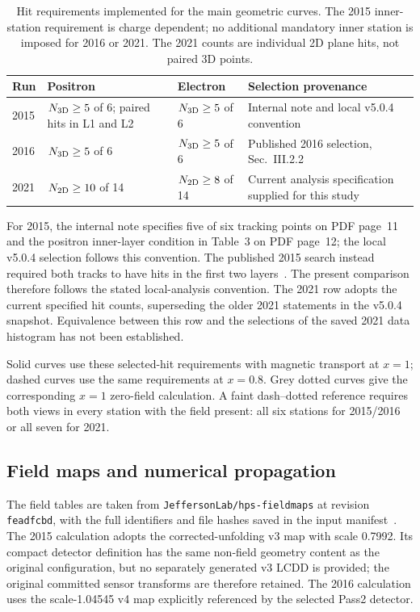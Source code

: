 \begin{table}[H]
\centering\small
\begin{tabular}{@{}l>{\raggedright\arraybackslash}p{3.9cm}>{\raggedright\arraybackslash}p{3.3cm}>{\raggedright\arraybackslash}p{4.0cm}@{}}
\toprule
Run & Positron & Electron & Selection provenance\\
\midrule
2015 & $N_{\rm 3D}\geq5$ of 6; paired hits in L1 and L2
     & $N_{\rm 3D}\geq5$ of 6
     & Internal note and local v5.0.4 convention~\cite{v571:internal2015,v571:note504}\\[3pt]
2016 & $N_{\rm 3D}\geq5$ of 6
     & $N_{\rm 3D}\geq5$ of 6
     & Published 2016 selection, Sec.~III.2.2~\cite{v571:HPS2016}\\[3pt]
2021 & $N_{\rm 2D}\geq10$ of 14
     & $N_{\rm 2D}\geq8$ of 14
     & Current analysis specification supplied for this study\\
\bottomrule
\end{tabular}
\caption{Hit requirements implemented for the main geometric curves.
The 2015 inner-station requirement is charge dependent; no additional
mandatory inner station is imposed for 2016 or 2021. The 2021 counts are
individual 2D plane hits, not paired 3D points.}
\label{v571:hit-selection}
\end{table}

For 2015, the internal note specifies five of six tracking points on PDF
page~11 and the positron inner-layer condition in Table~3 on PDF page~12;
the local v5.0.4 selection follows this convention. The published 2015
search instead required both tracks to have hits in the first two
layers~\cite{v571:HPS2015}. The present comparison therefore follows the
stated local-analysis convention. The 2021 row adopts the current specified
hit counts, superseding the older 2021 statements in the v5.0.4 snapshot.
Equivalence between this row and the selections of the saved 2021 data
histogram has not been established.

Solid curves use these selected-hit requirements with magnetic transport at
$x=1$; dashed curves use the same requirements at $x=0.8$. Grey dotted curves
give the corresponding $x=1$ zero-field calculation. A faint dash--dotted
reference requires both views in every station with the field present:
all six stations for 2015/2016 or all seven for 2021.

\subsection{Field maps and numerical propagation}
\label{v571:field-model}
The field tables are taken from \texttt{JeffersonLab/hps-fieldmaps} at
revision \texttt{feadfcbd}, with the full identifiers and file hashes saved
in the input manifest~\cite{v571:fieldmaps}. The 2015 calculation adopts
the corrected-unfolding v3 map with scale 0.7992. Its compact detector
definition has the same non-field geometry content as the original
configuration, but no separately generated v3 LCDD is provided; the original
committed sensor transforms are therefore retained. The 2016 calculation
uses the scale-1.04545 v4 map explicitly referenced by the selected Pass2
detector.

